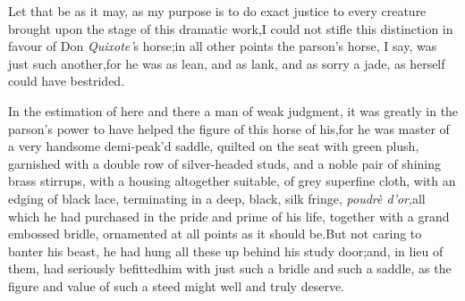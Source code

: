 \documentclass{article}
\begin{document}
Let that be as it may, as my purpose is to do exact justice to
every creature brought upon the stage of this dramatic
work,\tsk I could not stifle this distinction in favour of Don
\textit{Quixote’}s horse;\tsh in all other points the
parson’s horse, I say, was just such another,\tsk for he was as
lean, and as lank, and as sorry a jade, as 
herself could have bestrided.

In the estimation of here and there a man of weak judgment, it was greatly
in the parson’s power to have helped the figure of
this horse of his,\tsk for he was master of a very handsome
demi-peak’d saddle, quilted on the seat with green plush,
garnished with a double row of silver-headed studs, and a noble
pair of shining brass stirrups, with a housing altogether
suitable, of grey superfine cloth, with an edging of black lace,
terminating in a deep, black, silk fringe, \textit{poudrè
d’or},\tsk all which he had purchased in the pride and prime of
his life, together with a grand embossed bridle, ornamented at
all points as it should be.\tsh But not caring to banter his
beast, he had hung all these up behind his study door;\tsk and, in
lieu of them, had seriously befitted\break him with just such a bridle
and such a saddle, as the figure and value of such a steed might
well and truly deserve.
\end{document}
